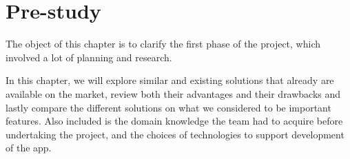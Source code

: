 \chapter{Pre-study}

\label{sec:prestudy}
The object of this chapter is to clarify the first phase of the project, which involved a lot of planning and research. 

In this chapter, we will explore similar and existing solutions that already are available on the market, review both their advantages and their drawbacks and lastly compare the different solutions on what we considered to be important features. Also included is the domain knowledge the team had to acquire before undertaking the project, and the choices of technologies to support development of the app.


\newpage




